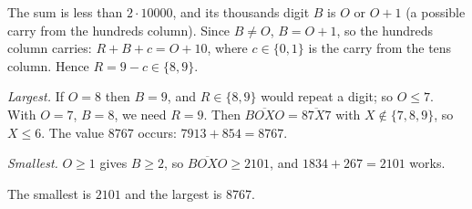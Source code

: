 The sum is less than $2\cdot10000$, and its thousands digit $B$ is $O$ or $O+1$ (a possible carry from the hundreds column). Since $B\ne O$, $B=O+1$, so the hundreds column carries: $R+B+c=O+10$, where $c\in\{0,1\}$ is the carry from the tens column. Hence $R=9-c\in\{8,9\}$.

\emph{Largest.} If $O=8$ then $B=9$, and $R\in\{8,9\}$ would repeat a digit; so $O\le7$. With $O=7$, $B=8$, we need $R=9$. Then $\overline{BOXO}=\overline{87X7}$ with $X\notin\{7,8,9\}$, so $X\le6$. The value $8767$ occurs: $7913+854=8767$.

\emph{Smallest.} $O\ge1$ gives $B\ge2$, so $\overline{BOXO}\ge2101$, and $1834+267=2101$ works.

The smallest is $\boxed{2101}$ and the largest is $\boxed{8767}$.
